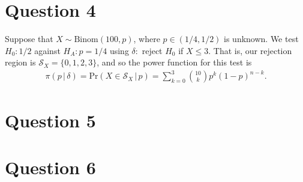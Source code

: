 \documentclass[10pt]{article}
\begin{document}
\section{Question 4} \noindent
Suppose that \(X \sim \mathrm{Binom}(100, p)\), where \(p \in (1/4, 1/2)\) is unknown. We test \(H_0 : 1/2\) against \(H_A : p = 1/4\) using \(\delta :\) 
reject \(H_0\) if \(X \le 3\). That is, our rejection region is \(\mathcal{S}_X = \{0,1,2,3\}\), and so the power function for this test is 
\begin{align*}
    \pi(p \,|\, \delta)
    = \mathrm{Pr}(X \in \mathcal{S}_X \,|\, p)
    = \sum_{k=0}^3 \binom{10}{k} p^k (1 - p)^{n - k}.
\end{align*}

\section{Question 5} \noindent


\section{Question 6} \noindent


\end{document}
